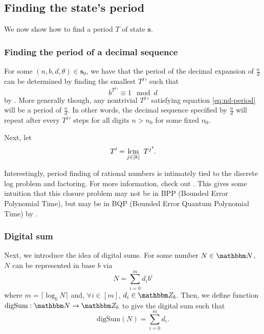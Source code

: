 \documentclass[11pt,titlepage]{article}
\newcommand{\rationalPeriod}{{T^j}'}
\newcommand{\rationalPeriodTotal}{{T}'}
\begin{document}
\subsection{Finding the state's period}
We now show how to find a period $T$ of state $\pmb{s}$.

\subsubsection{Finding the period of a decimal sequence}
For some $(n, b, d, \theta) \in \pmb{s}_0$,
we have that the period of the decimal expansion of $\frac{n}{d}$
can be determined by finding the smallest $\rationalPeriod$ such that
\begin{equation}
\label{eq:nd-period}
b ^ {\rationalPeriod} \equiv 1 \mod d
\end{equation}
by \cite{MathOverflowFracPeriod}.
More generally though, any nontrivial $\rationalPeriod$ satisfying equation \ref{eq:nd-period}
will be a period of $\frac{n}{d}$. In other words, the decimal sequence specified 
by $\frac{n}{d}$ will repeat after every $\rationalPeriod$ steps for all digits 
$n > n_0$ for some fixed $n_0$.

Next, let $$
\rationalPeriodTotal = \lcm{j \in [k]}\; \rationalPeriod.
$$

\begin{remark}[Complexity]
\label{remark:periodcomplex}
  Interestingly, period finding of rational numbers is intimately tied to the discrete
  log problem and factoring. For more information, check out \cite{MathOverflowFracPeriod}.
  This gives some intuition that this closure problem may not be in BPP (Bounded Error Polynomial Time),
  but may be in BQP (Bounded Error Quantum Polynomial Time) by \cite{Shor_1997}.
\end{remark}

\subsubsection{Digital sum}
Next, we introduce the idea of digital sums.
For some number $N \in \N$, $N$ can be represented in base $b$ via
\begin{equation}
  N = \sum_{i=0}^{m} d_i b^i
\end{equation}
where $m = \lceil \log_b N \rceil$ and, $\forall i \in [m]$, $d_i \in \Z_b$.
Then, we define function $\mathrm{digSum}: \N \rightarrow \Z_b$
to give the digital sum such that
\begin{equation}
  \mathrm{digSum}(N) = \sum_{i=0}^{m} d_i.
\end{equation}
\end{document}
